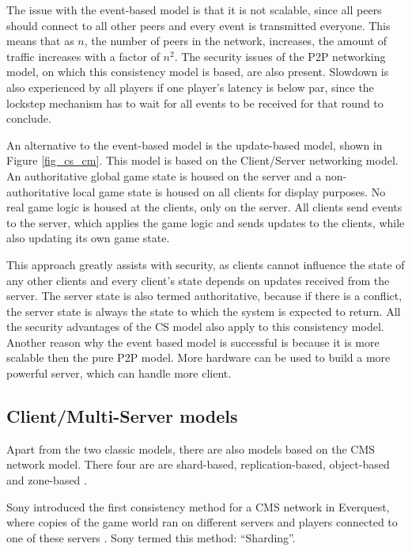 \documentclass[journal,oneside,a4paper,onecolumn]{IEEEtran}
\begin{document}
The issue with the event-based model is that it is not scalable, since all peers should connect to all other peers and every event is transmitted everyone. This means that as $n$, the number of peers in the network, increases, the amount of traffic increases with a factor of $n^2$. The security issues of the P2P networking model, on which this consistency model is based, are also present. Slowdown is also experienced by all players if one player's latency is below par, since the lockstep mechanism has to wait for all events to be received for that round to conclude.

An alternative to the event-based model is the update-based model, shown in Figure \ref{fig_cs_cm}. This model is based on the Client/Server networking model. An authoritative global game state is housed on the server and a non-authoritative local game state is housed on all clients for display purposes. No real game logic is housed at the clients, only on the server. All clients send events to the server, which applies the game logic and sends updates to the clients, while also updating its own game state.

This approach greatly assists with security, as clients cannot influence the state of any other clients and every client's state depends on updates received from the server. The server state is also termed authoritative, because if there is a conflict, the server state is always the state to which the system is expected to return. All the security advantages of the \ac{CS} model also apply to this consistency model. Another reason why the event based model is successful is because it is more scalable then the pure P2P model. More hardware can be used to build a more powerful server, which can handle more client.

\subsection{Client/Multi-Server models}
\label{cms_models}


Apart from the two classic models, there are also models based on the \ac{CMS} network model. There four are are shard-based, replication-based, object-based and zone-based \cite{Hu_voronoi_IM}.

Sony introduced the first consistency method for a \ac{CMS} network in Everquest, where copies of the game world ran on different servers and players connected to one of these servers \cite{engineering_everquest}. Sony termed this method: ``Sharding''.
\end{document}
